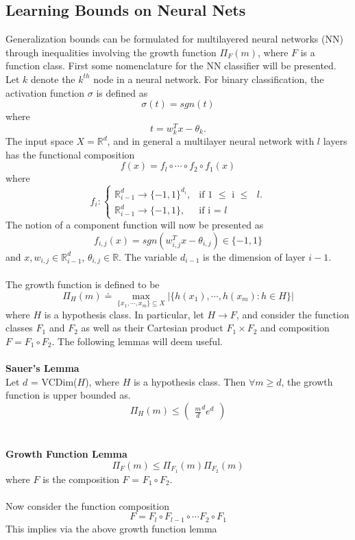 \documentclass{article} %
\begin{document}
\subsection{Learning Bounds on Neural Nets}
Generalization bounds can be formulated for multilayered neural networks (NN) through inequalities involving the growth function $\Pi_F(m)$, where $F$ is a function class. First some nomenclature for the NN classifier will be presented. Let $k$ denote the $k^{th}$ node in a neural network. For binary classification, the activation function $\sigma$ is defined as
$$
\sigma(t) = sgn(t)
$$
where
$$
t = w_k^Tx - \theta_k.
$$
The input space $X = \mathbb{R}^d$, and in general a multilayer neural network with $l$ layers has the functional composition
$$
f(x) = f_l \circ \cdots \circ f_2 \circ f_1 (x)
$$
where
$$
f_i : \begin{cases}
    \mathbb{R}^d_{i-1} \rightarrow \{-1,1\}^{d_i}, & \text{if 1 $\leq$ i $\leq$ $l$}.\\
    \mathbb{R}^d_{i-1} \rightarrow \{-1,1\}, & \text{if i = $l$}
  \end{cases}
$$
The notion of a component function will now be presented as
$$
f_{i,j}(x) = sgn(w_{i,j}^Tx - \theta_{i,j}) \in \{-1,1\}
$$
and $x,w_{i,j} \in \mathbb{R}^d_{i-1}$, $\theta_{i,j} \in \mathbb{R}$. The variable $d_{i-1}$ is the dimension of layer $i-1$.
\\
\\
The growth function is defined to be
$$
\Pi_H(m) \doteq \max_{\{x_1,\cdots,x_m\} \subseteq X} |\{h(x_1),\cdots,h(x_m) : h \in H \} |
$$
where $H$ is a hypothesis class. In particular, let $H \rightarrow F$, and consider the function classes $F_1$ and $F_2$ as well as their Cartesian product $F_1 \times F_2$ and composition $F = F_1 \circ F_2$. The following lemmas will deem useful.
\\
\\
\textbf{Sauer's Lemma}
\\
Let $d$ = VCDim($H$), where $H$ is a hypothesis class. Then $\forall m \geq d$, the growth function is upper bounded as.
$$
\Pi_H(m) \leq \begin{pmatrix}
\frac{m}{d}^de^d
\end{pmatrix}
$$
\\
\\
\textbf{Growth Function Lemma}
$$
\Pi_F(m) \leq \Pi_{F_1}(m)\Pi_{F_2}(m)
$$
where $F$ is the composition $F$ = $F_1 \circ F_2$.
\\
\\
Now consider the function composition
$$
F = F_l \circ F_{l-1} \circ \cdots F_2 \circ F_1
$$
This implies via the above growth function lemma
\end{document}
